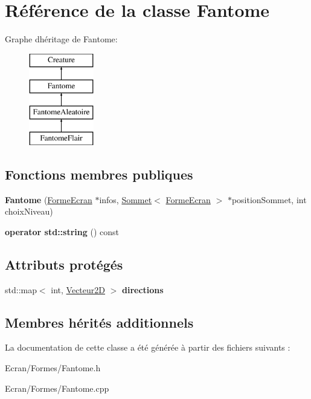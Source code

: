 \hypertarget{class_fantome}{}\section{Référence de la classe Fantome}
\label{class_fantome}
Graphe d\textquotesingle{}héritage de Fantome\+:\begin{figure}[H]
\begin{center}
\leavevmode
\includegraphics[height=4.000000cm]{class_fantome}
\end{center}
\end{figure}
\subsection*{Fonctions membres publiques}
\begin{DoxyCompactItemize}
\item 
\mbox{\label{class_fantome_a5a3bbcb96618f0bcc24d28eae9fd3976}} 
{\bfseries Fantome} (\mbox{\hyperlink{class_forme_ecran}{Forme\+Ecran}} $\ast$infos, \mbox{\hyperlink{class_sommet}{Sommet}}$<$ \mbox{\hyperlink{class_forme_ecran}{Forme\+Ecran}} $>$ $\ast$position\+Sommet, int choix\+Niveau)
\item 
\mbox{\label{class_fantome_a2e849b00168bbaa62070f64adca82d69}} 
{\bfseries operator std\+::string} () const
\end{DoxyCompactItemize}
\subsection*{Attributs protégés}
\begin{DoxyCompactItemize}
\item 
\mbox{\label{class_fantome_a183941314f6d7864abc8a65bf5c70a9d}} 
std\+::map$<$ int, \mbox{\hyperlink{class_vecteur2_d}{Vecteur2D}} $>$ {\bfseries directions}
\end{DoxyCompactItemize}
\subsection*{Membres hérités additionnels}


La documentation de cette classe a été générée à partir des fichiers suivants \+:\begin{DoxyCompactItemize}
\item 
Ecran/\+Formes/Fantome.\+h\item 
Ecran/\+Formes/Fantome.\+cpp\end{DoxyCompactItemize}
